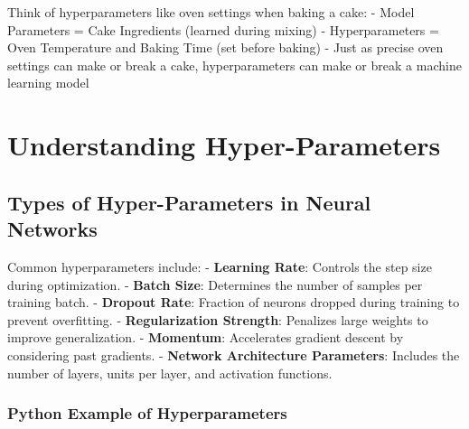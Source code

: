 \documentclass[
  letterpaper,
  DIV=11,
  numbers=noendperiod]{scrreprt}
\begin{document}
Think of hyperparameters like oven settings when baking a cake: - Model
Parameters = Cake Ingredients (learned during mixing) - Hyperparameters
= Oven Temperature and Baking Time (set before baking) - Just as precise
oven settings can make or break a cake, hyperparameters can make or
break a machine learning model

\section{Understanding
Hyper-Parameters}\label{sec-understanding-hyperparameters}

\subsection{Types of Hyper-Parameters in Neural
Networks}\label{types-of-hyper-parameters-in-neural-networks}

Common hyperparameters include: - \textbf{Learning Rate}: Controls the
step size during optimization. - \textbf{Batch Size}: Determines the
number of samples per training batch. - \textbf{Dropout Rate}: Fraction
of neurons dropped during training to prevent overfitting. -
\textbf{Regularization Strength}: Penalizes large weights to improve
generalization. - \textbf{Momentum}: Accelerates gradient descent by
considering past gradients. - \textbf{Network Architecture Parameters}:
Includes the number of layers, units per layer, and activation
functions.

\subsubsection{Python Example of
Hyperparameters}\label{python-example-of-hyperparameters}
\end{document}
